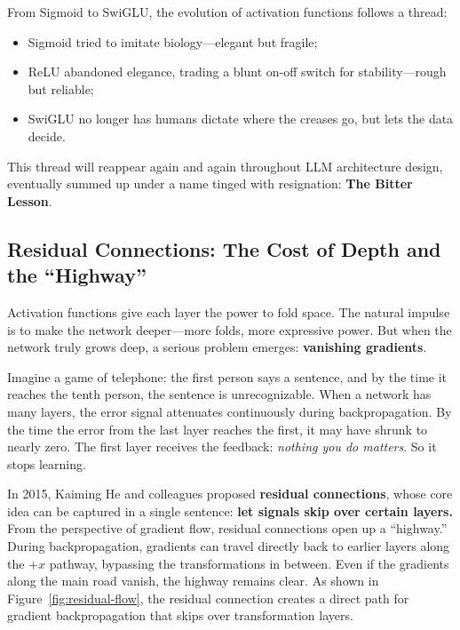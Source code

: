 From Sigmoid to SwiGLU, the evolution of activation functions follows a thread:

\begin{itemize}
\item Sigmoid tried to imitate biology---elegant but fragile;

\item ReLU abandoned elegance, trading a blunt on-off switch for stability---rough but reliable;

\item SwiGLU no longer has humans dictate where the creases go, but lets the data decide.
\end{itemize}

\vspace{1em}

This thread will reappear again and again throughout LLM architecture design, eventually summed up under a name tinged with resignation: \textbf{The Bitter Lesson}.

\subsection{Residual Connections: The Cost of Depth and the ``Highway''}

Activation functions give each layer the power to fold space. The natural impulse is to make the network deeper---more folds, more expressive power. But when the network truly grows deep, a serious problem emerges: \textbf{vanishing gradients}.

\vspace{1em}

Imagine a game of telephone: the first person says a sentence, and by the time it reaches the tenth person, the sentence is unrecognizable. When a network has many layers, the error signal attenuates continuously during backpropagation. By the time the error from the last layer reaches the first, it may have shrunk to nearly zero. The first layer receives the feedback: \textit{nothing you do matters}. So it stops learning.

\vspace{1em}

In 2015, Kaiming He and colleagues proposed \textbf{residual connections}, whose core idea can be captured in a single sentence: \textbf{let signals skip over certain layers.} From the perspective of gradient flow, residual connections open up a ``highway.'' During backpropagation, gradients can travel directly back to earlier layers along the $+x$ pathway, bypassing the transformations in between. Even if the gradients along the main road vanish, the highway remains clear. As shown in Figure~\ref{fig:residual-flow}, the residual connection creates a direct path for gradient backpropagation that skips over transformation layers.

